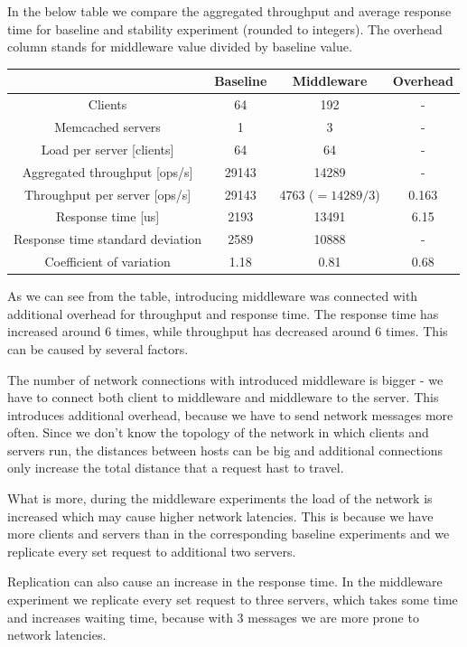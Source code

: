 \documentclass[11pt]{article}
\begin{document}
In the below table we compare the aggregated throughput and average response time for baseline and stability experiment (rounded to integers). The overhead column stands for middleware value divided by baseline value.
\medskip

\begin{tabular}{|c|c|c|c|}
\hline & \textbf{Baseline}& \textbf{Middleware} & \textbf{Overhead} \\ 
\hline Clients & 64 & 192 & - \\
\hline Memcached servers & 1 & 3 & - \\
\hline Load per server [clients] & 64 & 64 & -\\
\hline Aggregated throughput [ops/s] & 29143 & 14289 & - \\ 
\hline Throughput per server [ops/s] & 29143 & 4763 ($= 14289/3$) & 0.163 \\
\hline Response time [us] & 2193 & 13491 & 6.15 \\
\hline Response time standard deviation & 2589 & 10888 & - \\
\hline Coefficient of variation & 1.18 & 0.81 & 0.68 \\
\hline 
\end{tabular}
\medskip

As we can see from the table, introducing middleware was connected with additional overhead for throughput and response time. The response time has increased around 6 times, while throughput has decreased around 6 times. This can be caused by several factors. 

The number of network connections with introduced middleware is bigger - we have to connect both client to middleware and middleware to the server. This introduces additional overhead, because we have to send network messages more often. Since we don't know the topology of the network in which clients and servers run, the distances between hosts can be big and additional connections only increase the total distance that a request hast to travel. 

What is more, during the middleware experiments the load of the network is increased which may cause higher network latencies. This is because we have more clients and servers than in the corresponding baseline experiments and we replicate every set request to additional two servers.

Replication can also cause an increase in the response time. In the middleware experiment we replicate every set request to three servers, which takes some time and increases waiting time, because with 3 messages we are more prone to network latencies.
\end{document}
